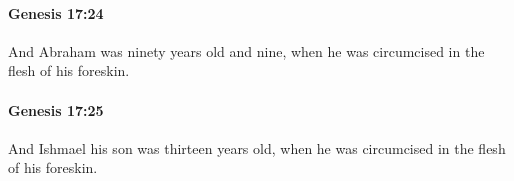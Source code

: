 		\paragraph{Genesis 17:24} %
			\label{GENESIS-17-24}

			And Abraham was ninety years old and nine, when he was circumcised in the flesh of his foreskin.


		\paragraph{Genesis 17:25} %
			\label{GENESIS-17-25}

			And Ishmael his son was thirteen years old, when he was circumcised in the flesh of his foreskin.


